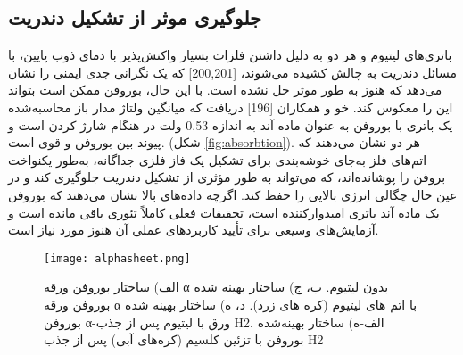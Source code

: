 \subsection{جلوگیری موثر از تشکیل دندریت}
باتری‌های لیتیوم و  هر دو به دلیل داشتن فلزات بسیار واکنش‌پذیر با دمای ذوب پایین، با مسائل دندریت به چالش کشیده می‌شوند، \cite{mortazaviElasticSofteningAlloy2013, chevrierChallengesNaionNegative2011}[200,201] که یک نگرانی جدی ایمنی را نشان می‌دهد که هنوز به طور موثر حل نشده است. با این حال، بوروفن ممکن است بتواند این را معکوس کند. خو و همکاران \cite{shiInitioPredictionBorophene2016}[196] دریافت که میانگین ولتاژ مدار باز محاسبه‌شده یک باتری  با بوروفن به عنوان ماده آند به اندازه 0.53 ولت در هنگام شارژ کردن است و پیوند بین بوروفن و  قوی است. (شکل \ref{fig:absorbtion}). هر دو نشان می‌دهند که اتم‌های فلز به‌جای خوشه‌بندی برای تشکیل یک فاز فلزی جداگانه، به‌طور یکنواخت بروفن را پوشانده‌اند، که می‌تواند به طور مؤثری از تشکیل دندریت جلوگیری کند و در عین حال چگالی انرژی بالایی را حفظ کند. اگرچه داده‌های بالا نشان می‌دهند که بوروفن یک ماده آند باتری امیدوارکننده است، تحقیقات فعلی کاملاً تئوری باقی مانده است و آزمایش‌های وسیعی برای تأیید کاربردهای عملی آن هنوز مورد نیاز است.
\begin{figure*}
    \centering
    \texttt{[image: alphasheet.png]}
    \caption{الف) ساختار بوروفن ورقه α بدون لیتیوم. ب، ج) ساختار بهینه شده بوروفن ورقه α با اتم های لیتیوم (کره های زرد). د، ه) ساختار بهینه شده بوروفن α-ورق با لیتیوم پس از جذب H2. الف-ه) ساختار بهینه‌شده بوروفن با تزئین کلسیم (کره‌های آبی) پس از جذب H2}
    \label{fig:alphasheet}
\end{figure*}
